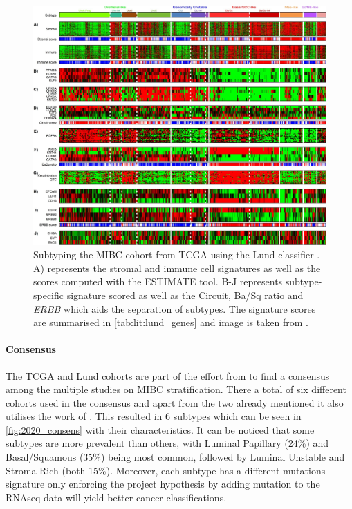 \begin{figure}[!htb]   
\centering
\includegraphics[width=1.0\textwidth,height=1.0\textheight,keepaspectratio]{Sections/Lit_review/Resources/Lung_subtypes.jpg}
  \caption{Subtyping the MIBC cohort from TCGA using the Lund classifier \cite{Marzouka2018-ge}. A) represents the stromal and immune cell signatures as well as the scores computed with the ESTIMATE tool\cite{Yoshihara2013-wq}. B-J represents subtype-specific signature scored as well as the Circuit, Ba/Sq ratio and \textit{ERBB} which aids the separation of subtypes. The signature scores are summarised in \cref{tab:lit:lund_genes} and image is taken from \cite{Marzouka2018-ge}.
}
\label{fig:lit:lund_fig}
\end{figure}
\FloatBarrier


\paragraph*{Consensus}

The TCGA and Lund cohorts are part of the effort from \citet{Kamoun2020-tj} to find a consensus among the multiple studies on MIBC stratification. There a total of six different cohorts used in the consensus and apart from the two already mentioned \citet{Kamoun2020-tj} it also utilises the work of \citet{Mo2018-rl, Damrauer2014-tc, Choi2014-ed, Rebouissou2014-ep}. This resulted in 6 subtypes which can be seen in \cref{fig:2020_consens} with their characteristics. It can be noticed that some subtypes are more prevalent than others, with Luminal Papillary (24\%) and Basal/Squamous (35\%) being most common, followed by Luminal Unstable and Stroma Rich (both 15\%). Moreover, each subtype has a different mutations signature only enforcing the project hypothesis by adding mutation to the RNAseq data will yield better cancer classifications.

